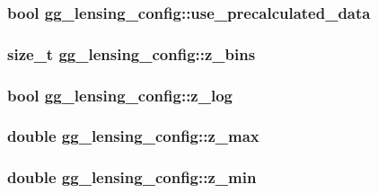\subsubsection[{use\+\_\+precalculated\+\_\+data}]{\setlength{\rightskip}{0pt plus 5cm}bool gg\+\_\+lensing\+\_\+config\+::use\+\_\+precalculated\+\_\+data}\label{structgg__lensing__config_a3fe4ca186ed399f741d499e1e0e4acf8}
\hypertarget{structgg__lensing__config_aff53350063b74ef73c8cea9b89a8780e}{}
\subsubsection[{z\+\_\+bins}]{\setlength{\rightskip}{0pt plus 5cm}size\+\_\+t gg\+\_\+lensing\+\_\+config\+::z\+\_\+bins}\label{structgg__lensing__config_aff53350063b74ef73c8cea9b89a8780e}
\hypertarget{structgg__lensing__config_a454b771c419a63d1512bbd220257b095}{}
\subsubsection[{z\+\_\+log}]{\setlength{\rightskip}{0pt plus 5cm}bool gg\+\_\+lensing\+\_\+config\+::z\+\_\+log}\label{structgg__lensing__config_a454b771c419a63d1512bbd220257b095}
\hypertarget{structgg__lensing__config_a16239d6e2c8ad5c3850abf9a47096701}{}
\subsubsection[{z\+\_\+max}]{\setlength{\rightskip}{0pt plus 5cm}double gg\+\_\+lensing\+\_\+config\+::z\+\_\+max}\label{structgg__lensing__config_a16239d6e2c8ad5c3850abf9a47096701}
\hypertarget{structgg__lensing__config_a983f7b673fc379bfcc96e69820057f8e}{}
\subsubsection[{z\+\_\+min}]{\setlength{\rightskip}{0pt plus 5cm}double gg\+\_\+lensing\+\_\+config\+::z\+\_\+min}\label{structgg__lensing__config_a983f7b673fc379bfcc96e69820057f8e}



